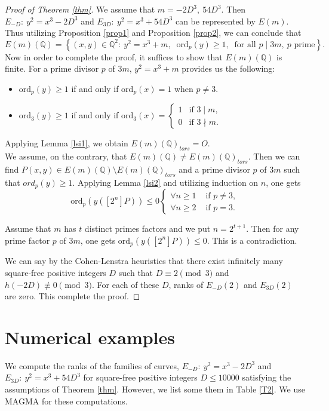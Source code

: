 \documentclass[12pt, 14paper,reqno]{amsart}
\theoremstyle{plain}
\theoremstyle{proof}
\numberwithin{equation}{section}
\begin{document}
\begin{proof}[Proof of Theorem \ref{thm}]
We assume that $m=-2D^3,~ 54D^3$. Then $E_{-D}:~ y^2=x^3-2D^3$ and $E_{3D}:~ y^2=x^3+54D^3$ can be represented by $E(m)$. Thus utilizing Proposition \ref{prop1} and Proposition \ref{prop2}, we can conclude that
$$
E(m)(\mathbb{Q})=\left\lbrace (x,y) \in \mathbb{Q}^2:~y^2=x^3+m,~\text{ ord}_p(y)\geq 1,~\text{ for all } p\mid 3m, ~p\text{ prime} \right\rbrace. 
$$
Now in order to complete the proof, it suffices to show that $E(m)(\mathbb{Q})$ is finite.
For a prime divisor $p$ of $3m$, $y^2=x^3+m$ provides us the following:
\begin{itemize}
\item[(I)] $\text{ord}_p(y)\geq 1$ if and only if $\text{ord}_p(x)=1$ when $p\ne 3$.
\item[(II)] $\text{ord}_3(y) \geq 1$ if and only if $
\text{ord}_3(x)=\begin{cases}
1 & \text{if } 3\mid m,
\\ 
0 & \text{if } 3\nmid m.
\end{cases}
$ 
\end{itemize}
Applying Lemma \ref{lsi1}, we obtain 
$E(m)(\mathbb{Q})_{tors} = O$. \\
We assume, on the contrary, that $E(m)(\mathbb{Q}) \neq E(m)(\mathbb{Q})_{tors}$. Then we can find $P(x,y) \in E(m)(\mathbb{Q})\setminus E(m)(\mathbb{Q})_{tors}$ and a prime divisor $p$ of $3m$ such that $ord_p(y)\geq 1$. Applying Lemma \ref{lsi2} and utilizing induction on $n$, one gets
$$\text{ord}_p(y([2^{n}]P))\leq 0 \begin{cases} \forall n\geq 1 & \text{ if }p\ne 3,\\
\forall n\geq 2 & \text{ if }p= 3.\end{cases}$$

Assume that $m$ has $t$ distinct primes factors and we put $n=2^{t+1}$.
Then for any prime factor $p$ of $3m$, one gets $\text{ord}_p(y([2^{n}]P)) \leq 0$.
This is a contradiction. 

We can say by the Cohen-Lenstra heuristics \cite{CL} that there exist infinitely many square-free positive integers $D$ such that $D\equiv 2\pmod 3$ and $h(-2D)\not\equiv 0\pmod 3$. For each of these $D$, ranks of $E_{-D}(2)$ and $E_{3D}(2)$ are zero. This complete the proof.     
\end{proof}
\section{Numerical examples}
We compute the ranks of the families of curves, $E_{-D}:~ y^2=x^3-2D^3$ and $E_{3D}:~ y^2=x^3+54D^3$ for square-free positive integers $D\leq 10000$ satisfying the assumptions of Theorem \ref{thm}. However, we list some them in Table \ref{T2}. We use MAGMA \cite{MA} for these computations.  
\end{document}
